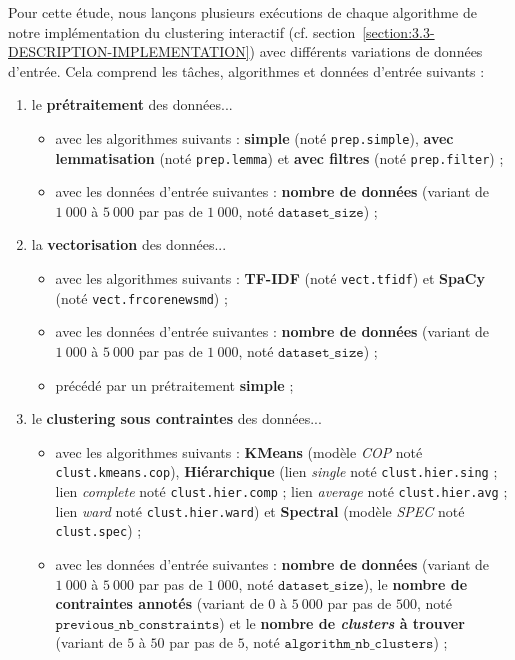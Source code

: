 			Pour cette étude, nous lançons plusieurs exécutions de chaque algorithme de notre implémentation du clustering interactif (cf. section~\ref{section:3.3-DESCRIPTION-IMPLEMENTATION}) avec différents variations de données d'entrée. Cela comprend les tâches, algorithmes et données d'entrée suivants :
			\begin{enumerate}
				\item le \textbf{prétraitement} des données...
					\begin{itemize}
						\item avec les algorithmes suivants : \textbf{simple} (noté \texttt{prep.simple}), \textbf{avec lemmatisation} (noté \texttt{prep.lemma}) et \textbf{avec filtres} (noté \texttt{prep.filter}) ;
						\item avec les données d'entrée suivantes : \textbf{nombre de données} (variant de $1~000$ à $5~000$ par pas de $1~000$, noté $\texttt{dataset\_size}$) ;
					\end{itemize}
				\item la \textbf{vectorisation} des données...
					\begin{itemize}
						\item avec les algorithmes suivants : \textbf{TF-IDF} (noté \texttt{vect.tfidf}) et \textbf{SpaCy} (noté \texttt{vect.frcorenewsmd}) ;
						\item avec les données d'entrée suivantes : \textbf{nombre de données} (variant de $1~000$ à $5~000$ par pas de $1~000$, noté $\texttt{dataset\_size}$) ;
						\item précédé par un prétraitement \textbf{simple} ;
					\end{itemize}
				\item le \textbf{clustering sous contraintes} des données...
					\begin{itemize}
						\item avec les algorithmes suivants : \textbf{KMeans} (modèle \textit{COP} noté \texttt{clust.kmeans.cop}), \textbf{Hiérarchique} (lien \textit{single} noté \texttt{clust.hier.sing} ; lien \textit{complete} noté \texttt{clust.hier.comp} ; lien \textit{average} noté \texttt{clust.hier.avg} ; lien \textit{ward} noté \texttt{clust.hier.ward}) et \textbf{Spectral} (modèle \textit{SPEC} noté \texttt{clust.spec}) ;
						\item avec les données d'entrée suivantes : \textbf{nombre de données} (variant de $1~000$ à $5~000$ par pas de $1~000$, noté $\texttt{dataset\_size}$), le \textbf{nombre de contraintes annotés} (variant de $0$ à $5~000$ par pas de $500$, noté $\texttt{previous\_nb\_constraints}$) et le \textbf{nombre de \textit{clusters} à trouver} (variant de $5$ à $50$ par pas de $5$, noté $\texttt{algorithm\_nb\_clusters}$) ;

\end{itemize}
\end{enumerate}
